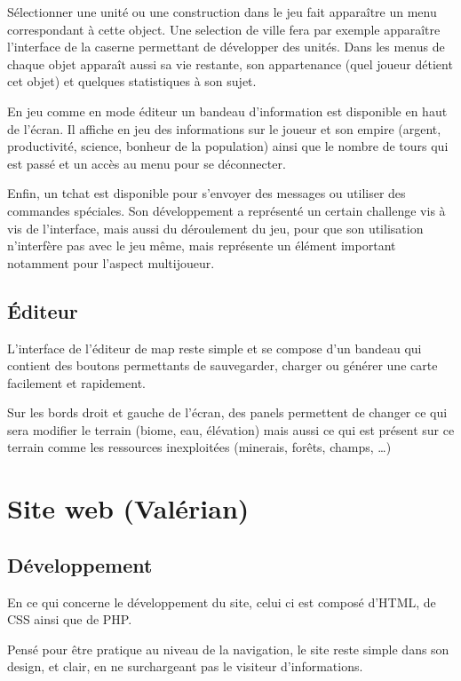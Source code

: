 \documentclass[12pt]{report}
\begin{document}
Sélectionner une unité ou une construction dans le jeu fait apparaître un menu
correspondant à cette object. Une selection de ville fera par exemple apparaître
l’interface de la caserne permettant de développer des unités. Dans les menus de
chaque objet apparaît aussi sa vie restante, son appartenance (quel joueur
détient cet objet) et quelques statistiques à son sujet.

En jeu comme en mode éditeur un bandeau d’information est disponible en haut de
l’écran. Il affiche en jeu des informations sur le joueur et son empire (argent,
productivité, science, bonheur de la population) ainsi que le nombre de tours
qui est passé et un accès au menu pour se déconnecter.

Enfin, un tchat est disponible pour s’envoyer des messages ou utiliser des
commandes spéciales. Son développement a représenté un certain challenge vis à
vis de l’interface, mais aussi du déroulement du jeu, pour que son utilisation
n’interfère pas avec le jeu même, mais représente un élément important notamment
pour l’aspect multijoueur.

\subsection{Éditeur}

L’interface de l’éditeur de map reste simple et se compose d’un bandeau qui
contient des boutons permettants de sauvegarder, charger ou générer une carte
facilement et rapidement.

Sur les bords droit et gauche de l’écran, des panels permettent de changer ce
qui sera modifier le terrain (biome, eau, élévation) mais aussi ce qui est
présent sur ce terrain comme les ressources inexploitées (minerais, forêts,
champs, …) 

\section{Site web (Valérian)}

\subsection{Développement}

En ce qui concerne le développement du site, celui ci est composé d’HTML, de CSS
ainsi que de PHP.

Pensé pour être pratique au niveau de la navigation, le site reste simple dans
son design, et clair, en ne surchargeant pas le visiteur d’informations. 
\end{document}

